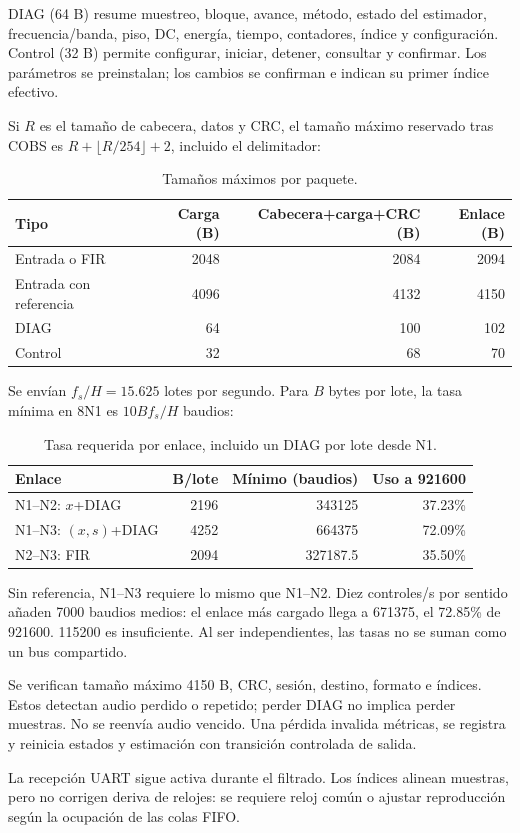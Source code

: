 \documentclass[11pt,a4paper]{article}
\begin{document}
DIAG (64 B) resume muestreo, bloque, avance, método, estado del estimador, frecuencia/banda, piso, DC, energía, tiempo, contadores, índice y configuración. Control (32 B) permite configurar, iniciar, detener, consultar y confirmar. Los parámetros se preinstalan; los cambios se confirman e indican su primer índice efectivo.

Si $R$ es el tamaño de cabecera, datos y CRC, el tamaño máximo reservado tras COBS es $R+\lfloor R/254\rfloor+2$, incluido el delimitador:
\begin{table}[H]\centering\caption{Tamaños máximos por paquete.}\begin{tabular}{lrrr}\toprule Tipo&Carga (B)&Cabecera+carga+CRC (B)&Enlace (B)\\\midrule Entrada o FIR&2048&2084&2094\\Entrada con referencia&4096&4132&4150\\DIAG&64&100&102\\Control&32&68&70\\\bottomrule\end{tabular}\end{table}
Se envían $f_s/H=15.625$ lotes por segundo. Para $B$ bytes por lote, la tasa mínima en 8N1 es $10Bf_s/H$ baudios:
\begin{table}[H]\centering\small\caption{Tasa requerida por enlace, incluido un DIAG por lote desde N1.}\begin{tabular}{lrrr}\toprule Enlace&B/lote&Mínimo (baudios)&Uso a 921600\\\midrule N1--N2: $x$+DIAG&2196&343125&37.23\%\\N1--N3: $(x,s)$+DIAG&4252&664375&72.09\%\\N2--N3: FIR&2094&327187.5&35.50\%\\\bottomrule\end{tabular}\end{table}
Sin referencia, N1--N3 requiere lo mismo que N1--N2. Diez controles/s por sentido añaden 7000 baudios medios: el enlace más cargado llega a 671375, el 72.85\% de 921600. 115200 es insuficiente. Al ser independientes, las tasas no se suman como un bus compartido.

Se verifican tamaño máximo 4150 B, CRC, sesión, destino, formato e índices. Estos detectan audio perdido o repetido; perder DIAG no implica perder muestras. No se reenvía audio vencido. Una pérdida invalida métricas, se registra y reinicia estados y estimación con transición controlada de salida.

La recepción UART sigue activa durante el filtrado. Los índices alinean muestras, pero no corrigen deriva de relojes: se requiere reloj común o ajustar reproducción según la ocupación de las colas FIFO.
\end{document}
